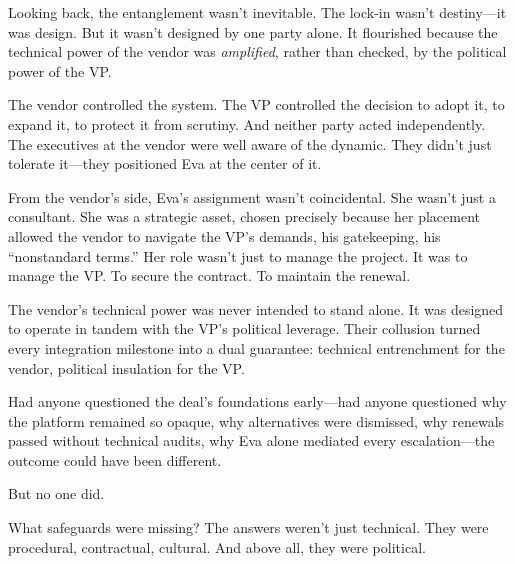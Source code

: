 Looking back, the entanglement wasn’t inevitable. The lock-in wasn’t destiny—it was design. But it wasn’t designed by one party alone. It flourished because the technical power of the vendor was \textit{amplified}, rather than checked, by the political power of the VP.

The vendor controlled the system. The VP controlled the decision to adopt it, to expand it, to protect it from scrutiny. And neither party acted independently. The executives at the vendor were well aware of the dynamic. They didn’t just tolerate it—they positioned Eva at the center of it.

From the vendor’s side, Eva’s assignment wasn’t coincidental. She wasn’t just a consultant. She was a strategic asset, chosen precisely because her placement allowed the vendor to navigate the VP’s demands, his gatekeeping, his “nonstandard terms.” Her role wasn’t just to manage the project. It was to manage the VP. To secure the contract. To maintain the renewal.

The vendor’s technical power was never intended to stand alone. It was designed to operate in tandem with the VP’s political leverage. Their collusion turned every integration milestone into a dual guarantee: technical entrenchment for the vendor, political insulation for the VP.

Had anyone questioned the deal’s foundations early—had anyone questioned why the platform remained so opaque, why alternatives were dismissed, why renewals passed without technical audits, why Eva alone mediated every escalation—the outcome could have been different.

But no one did.

What safeguards were missing? The answers weren’t just technical. They were procedural, contractual, cultural. And above all, they were political.

